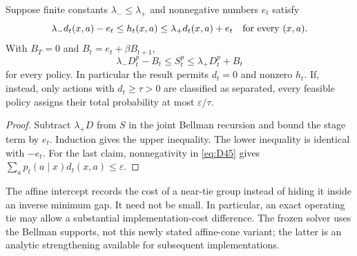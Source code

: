 \begin{proposition}\label{prop:affine45}
Suppose finite constants $\lambda_-\le\lambda_+$ and nonnegative numbers $e_t$ satisfy
\[
 \lambda_-d_t(x,a)-e_t\le h_t(x,a)\le\lambda_+d_t(x,a)+e_t
 \quad\hbox{for every }(x,a).
\]
With $B_T=0$ and $B_t=e_t+\beta B_{t+1}$,
\begin{equation}\label{eq:affine45}
 \lambda_-D_t^p-B_t\le S_t^p\le\lambda_+D_t^p+B_t
\end{equation}
for every policy. In particular the result permits $d_t=0$ and nonzero $h_t$. If, instead, only actions with $d_t\ge\tau>0$ are classified as separated, every feasible policy assigns their total probability at most $\varepsilon/\tau$.
\end{proposition}
\begin{proof}
Subtract $\lambda_+D$ from $S$ in the joint Bellman recursion and bound the stage term by $e_t$. Induction gives the upper inequality. The lower inequality is identical with $-e_t$. For the last claim, nonnegativity in \eqref{eq:D45} gives $\sum_a p_t(a\mid x)d_t(x,a)\le\varepsilon$.
\end{proof}
The affine intercept records the cost of a near-tie group instead of hiding it inside an inverse minimum gap. It need not be small. In particular, an exact operating tie may allow a substantial implementation-cost difference. The frozen solver uses the Bellman supports, not this newly stated affine-cone variant; the latter is an analytic strengthening available for subsequent implementations.

